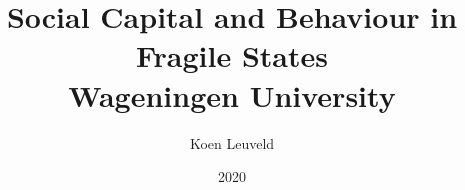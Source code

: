 



\title{
	{Social Capital and Behaviour in Fragile States}\\
	{\large Wageningen University}\\
}
\author{Koen Leuveld}
\date{2020}

\maketitle
\tableofcontents
\todototoc
\listoftodos

 
%
%
%
%
%













